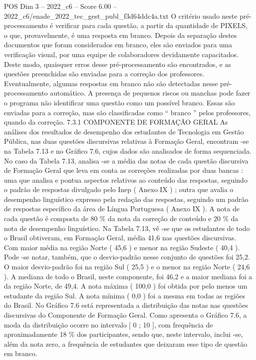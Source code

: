 \begin{textsample}{POS Dim 3 – 2022\_c6 – Score 6.00 – 2022\_c6/enade\_2022\_tec\_gest\_publ\_f3d64ddc4a.txt}
O critério usado neste pré-processamento é verificar para cada questão, a partir da quantidade de PIXELS, o que, provavelmente, é uma resposta em branco.
Depois da separação destes documentos que foram considerados em branco, eles são enviados para uma verificação visual, por uma equipe de colaboradores devidamente capacitados.
Deste modo, quaisquer erros desse pré-processamento são encontrados, e as questões preenchidas são enviadas para a correção dos professores.
Eventualmente, algumas respostas em branco não são detectadas nesse pré-processamento automático.
A presença de pequenos riscos ou manchas pode fazer o programa não identificar uma questão como um possível branco.
Essas são enviadas para a correção, mas são classificadas como “ branco ” pelos professores, quando da correção. 7.3.1 COMPONENTE DE FORMAÇÃO GERAL As análises dos resultados de desempenho dos estudantes de Tecnologia em Gestão Pública, nas duas questões discursivas relativas à Formação Geral, encontram -se na Tabela 7.13 e no Gráfico 7.6, cujos dados são analisados de forma sequenciada.
No caso da Tabela 7.13, analisa -se a média das notas de cada questão discursiva de Formação Geral que leva em conta as correções realizadas por duas bancas : uma que analisa e pontua aspectos relativos ao conteúdo das respostas, seguindo o padrão de respostas divulgado pelo Inep ( Anexo IX ) ; outra que avalia o desempenho linguístico expresso pela redação das respostas, seguindo um padrão de respostas específico da área de Língua Portuguesa ( Anexo IX ).
A nota de cada questão é composta de 80 \% da nota da correção de conteúdo e 20 \% da nota de desempenho linguístico.
Na Tabela 7.13, vê -se que os estudantes de todo o Brasil obtiveram, em Formação Geral, média 41,6 nas questões discursivas.
Com maior média na região Norte ( 45,6 ) e menor na região Sudeste ( 40,4 ).
Pode -se notar, também, que o desvio-padrão nesse conjunto de questões foi 25,2.
O maior desvio-padrão foi na região Sul ( 25,5 ) e o menor na região Norte ( 24,6 ).
A mediana de todo o Brasil, neste componente, foi 46,2 e a maior mediana foi a da região Norte, de 49,4.
A nota máxima ( 100,0 ) foi obtida por pelo menos um estudante da região Sul.
A nota mínima ( 0,0 ) foi a mesma em todas as regiões do Brasil.
No Gráfico 7.6 está representada a distribuição das notas nas questões discursivas do Componente de Formação Geral.
Como apresenta o Gráfico 7.6, a moda da distribuição ocorre no intervalo [ 0 ; 10 ], com frequência de aproximadamente 18 \% dos participantes, sendo que, neste intervalo, inclui -se, além da nota zero, a frequência de estudantes que deixaram esse tipo de questão em branco.

\end{textsample}

